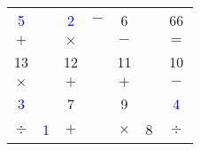       {
         \begin{tabular}{|*{7}{C{0.6}|}}
              
            \textcolor{blue}{5} & & \textcolor{blue}{2} & $-$ & 6 & & 66 \\
              
            $+$ & & $\times$ & & $-$ && $=$ \\
               
            13 & &12 & &11 & &10 \\
                
             $\times$ & & $+$ & & $+$ && $-$ \\
               
            \textcolor{blue}{3} & & 7 & & 9 & & \textcolor{blue}{4} \\
             
            $\div$ & \textcolor{blue}{1} & $+$ & & $\times$ & 8 & $\div$ \\
             
         \end{tabular}}

\Coupe

\partie \bigskip

